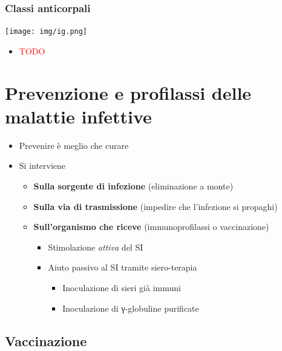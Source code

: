 \documentclass[italian,]{article}
\providecommand{\tightlist}{%
  \setlength{\itemsep}{0pt}\setlength{\parskip}{0pt}}
\newcommand{\TODO}[1]{\textcolor{red}{\textsf{\footnotesize{TODO #1}}}} %
\begin{document}
\hypertarget{classi-anticorpali}{%
\subsubsection{Classi anticorpali}\label{classi-anticorpali}}

\texttt{[image: img/ig.png]}~

\begin{itemize}
\item
  \TODO{}
\end{itemize}

\hypertarget{prevenzione-e-profilassi-delle-malattie-infettive}{%
\section{Prevenzione e profilassi delle malattie
infettive}\label{prevenzione-e-profilassi-delle-malattie-infettive}}

\begin{itemize}
\tightlist
\item
  Prevenire è meglio che curare
\item
  Si interviene

  \begin{itemize}
  \tightlist
  \item
    \textbf{Sulla sorgente di infezione} (eliminazione a monte)
  \item
    \textbf{Sulla via di trasmissione} (impedire che l'infezione si
    propaghi)
  \item
    \textbf{Sull'organismo che riceve} (immunoprofilassi o vaccinazione)

    \begin{itemize}
    \tightlist
    \item
      Stimolazione \emph{attiva} del SI
    \item
      Aiuto passivo al SI tramite siero-terapia

      \begin{itemize}
      \tightlist
      \item
        Inoculazione di sieri già immuni
      \item
        Inoculazione di γ-globuline purificate
      \end{itemize}
    \end{itemize}
  \end{itemize}
\end{itemize}

\hypertarget{vaccinazione}{%
\subsection{Vaccinazione}\label{vaccinazione}}
\end{document}
